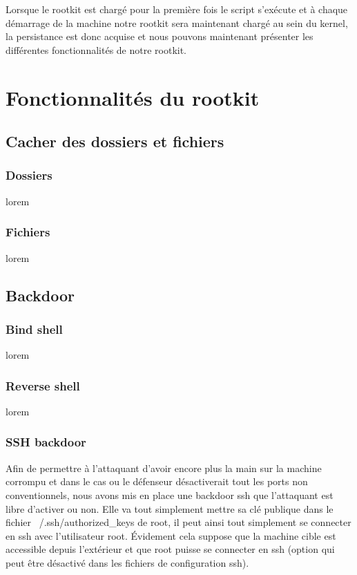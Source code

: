 \documentclass[11pt]{article}
\begin{document}
	Lorsque le rootkit est chargé pour la première fois le script s'exécute et à chaque démarrage de la machine notre rootkit sera maintenant chargé au sein du kernel, la persistance est donc acquise et nous pouvons maintenant présenter les différentes fonctionnalités de notre rootkit.
	
\section{Fonctionnalités du rootkit}
	
	\subsection{Cacher des dossiers et fichiers}
	
		\subsubsection{Dossiers}
			lorem
		\subsubsection{Fichiers}
			lorem
			
	\subsection{Backdoor}
	
		\subsubsection{Bind shell}
			lorem
		\subsubsection{Reverse shell}
			lorem	
		\subsubsection{SSH backdoor}
		
			Afin de permettre à l'attaquant d'avoir encore plus la main sur la machine corrompu et dans le cas ou le défenseur désactiverait tout les ports non conventionnels, nous avons mis en place une backdoor ssh que l'attaquant est libre d'activer ou non. Elle va tout simplement mettre sa clé publique  dans le fichier ~/.ssh/authorized\_keys de root, il peut ainsi tout simplement se connecter en ssh avec l'utilisateur root. Évidement cela suppose que la machine cible est accessible depuis l'extérieur et que root puisse se connecter en ssh (option qui peut être désactivé dans les fichiers de configuration ssh).
			
\end{document}

